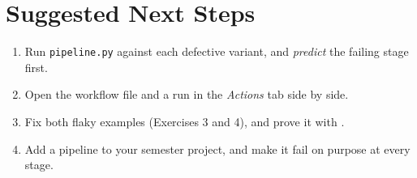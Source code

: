 \documentclass[11pt]{article}
\begin{document}
\section{Suggested Next Steps}
\begin{enumerate}
\item Run \texttt{pipeline.py} against each defective variant, and
\emph{predict} the failing stage first.
\item Open the workflow file and a run in the \emph{Actions} tab side by
side.
\item Fix both flaky examples (Exercises 3 and 4), and prove it with
.
\item Add a pipeline to your semester project, and make it fail on
purpose at every stage.
\end{enumerate}
\end{document}
